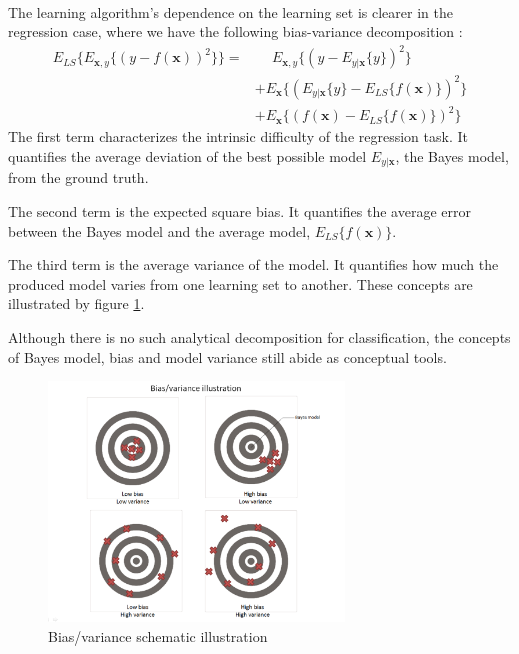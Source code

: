 \documentclass[a4paper]{report}
\begin{document}
\paragraph{}
The learning algorithm's dependence on the learning set is clearer in the regression case, where we have the following bias-variance decomposition : 
\begin{align*}
	E_{LS} \{ E_{\boldsymbol{x},y} \{ (y - f(\boldsymbol{x}))^2\} \} = &\phantom{+} E_{\boldsymbol{x},y} \{ (y - E_{y|\boldsymbol{x}}\{ y\})^2 \}  \\
	                                                                   &+ E_{\boldsymbol{x}} \{ (E_{y|\boldsymbol{x}}\{ y\} - E_{LS}\{f(\boldsymbol{x})\})^2 \}  \\
																																	   &+ E_{\boldsymbol{x}} \{ (f(\boldsymbol{x}) -  E_{LS}\{f(\boldsymbol{x})\})^2 \}
\end{align*}
The first term characterizes the intrinsic difficulty of the regression task. It quantifies the average deviation of the best possible model $E_{y|\boldsymbol{x}}$, the Bayes model, from the ground truth.
\par
The second term is the expected square bias. It quantifies the average error between the Bayes model and the average model, $E_{LS}\{f(\boldsymbol{x})\}$. 
\par
The third term is the average variance of the model. It quantifies how much the produced model varies from one learning set to another. These concepts are illustrated by figure \ref{fig:BiasVariance}.
\par
Although there is no such analytical decomposition for classification, the concepts of Bayes model, bias and model variance still abide as conceptual tools.
\begin{figure}
	\centering
		\includegraphics[width=0.7\textwidth]{images/BiasVariance.png}
	\caption{\label{fig:BiasVariance}Bias/variance schematic illustration}
\end{figure}
\end{document}
